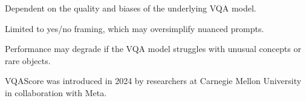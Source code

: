 {
\item Dependent on the quality and biases of the underlying VQA model.
\item Limited to yes/no framing, which may oversimplify nuanced prompts.
\item Performance may degrade if the VQA model struggles with unusual concepts or rare objects.
}

\clearpage

\thispagestyle{customstyle}

{VQAScore was introduced in 2024 by researchers at Carnegie Mellon University in collaboration with Meta.}
